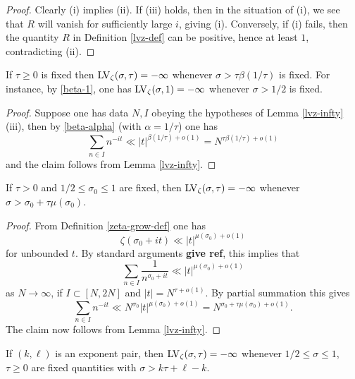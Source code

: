 \begin{proof} Clearly (i) implies (ii).
If (iii) holds, then in the situation of (i), we see that $R$ will vanish for sufficiently large $i$, giving (i). Conversely, if (i) fails, then the quantity $R$ in Definition \ref{lvz-def} can be positive, hence at least $1$, contradicting (ii).
\end{proof}

\begin{corollary}\label{beta-zeta-vanish}\label{lvz-def}  If $\tau \geq 0$ is fixed then $\mathrm{LV}_\zeta(\sigma,\tau) = -\infty$ whenever $\sigma > \tau \beta(1/\tau)$ is fixed. For instance, by \eqref{beta-1}, one has $\mathrm{LV}_\zeta(\sigma,1)=-\infty$ whenever $\sigma > 1/2$ is fixed.
\end{corollary}

\begin{proof} Suppose one has data $N, I$  obeying the hypotheses of Lemma \ref{lvz-infty}(iii), then by \eqref{beta-alpha} (with $\alpha = 1/\tau$) one has
$$ \sum_{n \in I} n^{-it} \ll |t|^{\beta(1/\tau)+o(1)} = N^{\tau \beta(1/\tau)+o(1)}$$
and the claim follows from Lemma \ref{lvz-infty}.
\end{proof}

\begin{corollary}\label{lvz-mu}  If $\tau > 0$ and $1/2 \leq \sigma_0 \leq 1$ are fixed, then $\mathrm{LV}_\zeta(\sigma,\tau) = -\infty$ whenever $\sigma > \sigma_0 + \tau \mu(\sigma_0)$.
\end{corollary}

\begin{proof} From Definition \ref{zeta-grow-def} one has
    $$ \zeta(\sigma_0 + it) \ll |t|^{\mu(\sigma_0) + o(1)}$$
    for unbounded $t$.  By standard arguments {\bf give ref}, this implies that
    $$ \sum_{n \in I} \frac{1}{n^{\sigma_0+it}} \ll |t|^{\mu(\sigma_0) + o(1)}$$
as $N \to \infty$, if $I \subset [N,2N]$ and $|t| = N^{\tau+o(1)}$.  By partial summation this gives
$$ \sum_{n \in I} n^{-it} \ll N^{\sigma_0} |t|^{\mu(\sigma_0) + o(1)} = N^{\sigma_0 + \tau \mu(\sigma_0) + o(1)}.$$
The claim now follows from Lemma \ref{lvz-infty}.
\end{proof}

\begin{corollary}\label{lvz-exp} If $(k,\ell)$ is an exponent pair, then $\mathrm{LV}_\zeta(\sigma,\tau) = -\infty$ whenever $1/2 \leq \sigma \leq 1$, $\tau \geq 0$ are fixed quantities with $\sigma > k \tau + \ell - k$.
\end{corollary}

